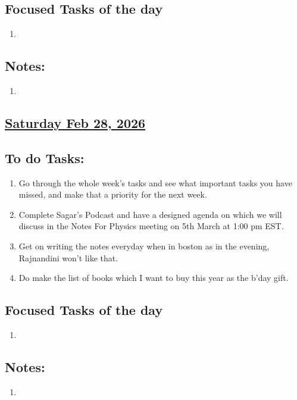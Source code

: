 \subsection*{Focused Tasks of the day}
\begin{enumerate}[\ding{212}]  
    \item 
\end{enumerate}
\subsection*{Notes:}
\begin{enumerate}
    \item 
\end{enumerate}
\subsection*{\underline{Saturday Feb 28, 2026} }
\subsection*{To do Tasks:}
\begin{enumerate}
    \item Go through the whole week's tasks and see what important tasks you have missed, and make that a priority for the next week.
    \item Complete Sagar's Podcast and have a designed agenda on which we will discuss in the Notes For Physics meeting on 5th March at 1:00 pm EST.
    \item Get on writing the notes everyday when in boston as in the evening, Rajnandini won't like that.
    \item Do make the list of books which I want to buy this year as the b'day gift.
\end{enumerate}
\subsection*{Focused Tasks of the day}
\begin{enumerate}[\ding{212}]  
    \item 
\end{enumerate}
\subsection*{Notes:}
\begin{enumerate}
    \item 
\end{enumerate}
\stardivider
